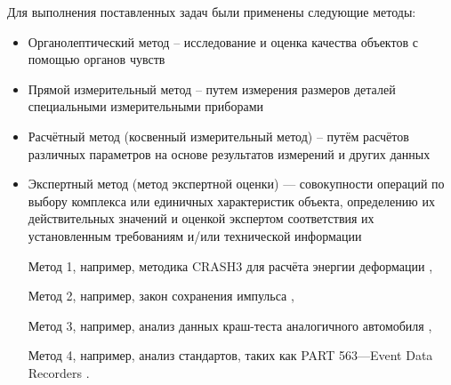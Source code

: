 
Для выполнения поставленных задач были применены следующие методы:
\begin{itemize}
	\item  Органолептический метод – исследование и оценка качества объектов с помощью органов чувств
	\item 	Прямой измерительный метод – путем измерения размеров деталей специальными измерительными приборами
	\item Расчётный метод (косвенный измерительный метод) – путём расчётов различных параметров на основе результатов измерений и других данных
	\item Экспертный метод (метод экспертной оценки) — совокупности операций по выбору комплекса или единичных характеристик объекта, определению их действительных значений и оценкой экспертом соответствия их установленным требованиям и/или технической информации
	\item [Метод 1, например, методика CRASH3 для расчёта энергии деформации],
	\item [Метод 2, например, закон сохранения импульса],
	\item [Метод 3, например, анализ данных краш-теста аналогичного автомобиля],
	\item [Метод 4, например, анализ стандартов, таких как PART 563---Event Data Recorders].
\end{itemize}

%
